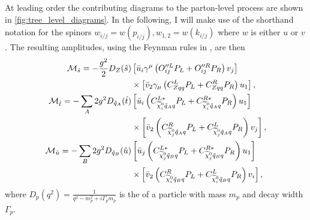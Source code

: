 \documentclass[../main.tex]{subfiles}
\begin{document}
            At leading order the contributing diagrams to the parton-level process are shown in \cref{fig:tree_level_diagrams}.
            In the following, I will make use of the shorthand notation for the spinors \(w_{i/j} = w(p_{i/j}), w_{1,2} = w(k_{i/j})\) where \(w\) is either \(u\) or \(v\).
            The resulting amplitudes, using the Feynman rules in , are then
            \begin{subequations}
                \begin{align}
                    \nonumber
                    \M_{\hat{s}} = -\frac{g^2}{2} D_Z(\hat{s})           & \bclosed{ \bar{u}_i\gamma^\mu\pclosed{O^{\prime\prime L}_{ij}P_L + O^{\prime\prime R}_{ij}P_R} v_j }           \\
                                                                         & \times \bclosed{ \bar{v}_2 \gamma_\mu \pclosed{C^L_{Zqq}P_L + C^R_{Zqq}P_R} u_1 },                             \\
                    \nonumber
                    \M_{\hat{t}} = -\sum_A 2g^2 D_{\tilde{q}_A}(\hat{t}) & \bclosed{ \bar{u}_i \pclosed{C_{\nino[i]\tilde{q}_Aq}^{L\ast}P_L + C_{\nino[i]\tilde{q}_Aq}^{R\ast} P_R} u_1 } \\
                                                                         & \times \bclosed{ \bar{v}_2 \pclosed{C^R_{\nino[j]\tilde{q}_Aq}P_L + C^L_{\nino[j]\tilde{q}_Aq}P_R} v_j },      \\
                    \nonumber
                    \M_{\hat{u}} = -\sum_B 2g^2 D_{\tilde{q}_B}(\hat{u}) & \bclosed{ \bar{u}_j \pclosed{C_{\nino[j]\tilde{q}_Bq}^{L\ast}P_L + C_{\nino[j]\tilde{q}_Bq}^{R\ast} P_R} u_1 } \\
                                                                         & \times \bclosed{ \bar{v}_2 \pclosed{C^R_{\nino[i]\tilde{q}_Bq}P_L + C^L_{\nino[i]\tilde{q}_Bq}P_R} v_i },
                \end{align}
            \end{subequations}
            where \(D_p(q^2) = \frac{1}{q^2 - m_p^2 + i\Gamma_p m_p}\) is the  of a particle with mass \(m_p\) and decay width \(\Gamma_p\).
\end{document}
